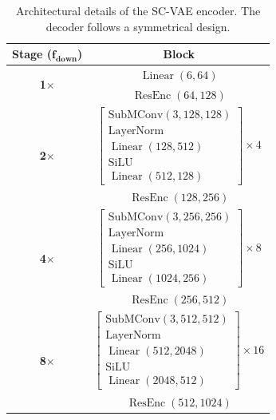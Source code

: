 \documentclass[10pt,twocolumn,letterpaper]{article}
\begin{document}
\begin{table}
    \centering  
    \scriptsize
    \caption{Architectural details of the SC-VAE encoder. The decoder follows a symmetrical design.}  
    \vspace{-8pt}
	\begin{tabular}{c|c}  
        \toprule
        \textbf{Stage ($\boldsymbol{f_{\text{down}}}$)} & \textbf{Block} \\
        \midrule  
            \multirow{2}{*}{\textbf{1$\times$}} & $\operatorname{Linear}(6, 64)$ \\
            & $\operatorname{ResEnc}(64, 128)$ \\
        \midrule  
            \multirow{2}{*}{\textbf{2$\times$}} & $\left[\begin{matrix}\operatorname{SubMConv(3, 128, 128)}\\\operatorname{LayerNorm}\\\operatorname{Linear}(128,512)\\\operatorname{SiLU}\\\operatorname{Linear}(512,128)\end{matrix}\right]\times4$  \\
            & $\operatorname{ResEnc}(128, 256)$ \\
        \midrule  
            \multirow{2}{*}{\textbf{4$\times$}} & $\left[\begin{matrix}\operatorname{SubMConv(3, 256, 256)}\\\operatorname{LayerNorm}\\\operatorname{Linear}(256,1024)\\\operatorname{SiLU}\\\operatorname{Linear}(1024,256)\end{matrix}\right]\times8$  \\
            & $\operatorname{ResEnc}(256, 512)$ \\
        \midrule  
            \multirow{2}{*}{\textbf{8$\times$}} & $\left[\begin{matrix}\operatorname{SubMConv(3, 512, 512)}\\\operatorname{LayerNorm}\\\operatorname{Linear}(512,2048)\\\operatorname{SiLU}\\\operatorname{Linear}(2048,512)\end{matrix}\right]\times16$  \\
            & $\operatorname{ResEnc}(512, 1024)$ \\

\end{tabular}
\end{table}
\end{document}
